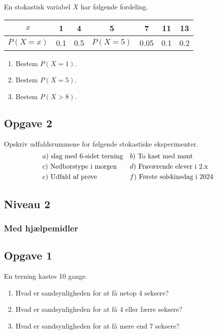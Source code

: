 En stokastisk variabel $X$ har følgende fordeling.
\begin{table}[H]
	\centering
	\begin{tabular}{c|c|c|c|c|c|c}
		$x$ & 1 & 4 & 5 & 7 & 11 & 13 \\
		\hline
		$P(X = x)$ & 0.1 & 0.5 & $P(X = 5)$ & 0.05 & 0.1 & 0.2
	\end{tabular}
\end{table}

\begin{enumerate}[label=\roman*)]
	\item Bestem $P(X = 1)$.
	\item Bestem $P(X = 5)$.
	\item Bestem $P(X > 8)$.
\end{enumerate}

\subsection*{Opgave 2}

Opskriv udfaldsrummene for følgende stokastiske eksperimenter.
\begin{align*}
	&a) \ \textnormal{slag med 6-sidet terning}     &&b) \ \textnormal{To kast med mønt}     \\
	&c) \ \textnormal{Nedbørstype i morgen}   &&d) \ \textnormal{Fraværende elever i 2.x}     \\
	&e) \ \textnormal{Udfald af prøve}    &&f) \ \textnormal{Første solskinsdag i 2024}       \\
\end{align*}


\subsection*{Niveau 2}
\subsubsection*{Med hjælpemidler}

\subsection*{Opgave 1}
En terning kastes 10 gange.
\begin{enumerate}[label=\roman*)]
	\item Hvad er sandsynligheden for at få netop 4 seksere?
	\item Hvad er sandsynligheden for at få 4 eller færre seksere?
	\item Hvad er sandsynligheden for at få mere end 7 seksere?
\end{enumerate}

